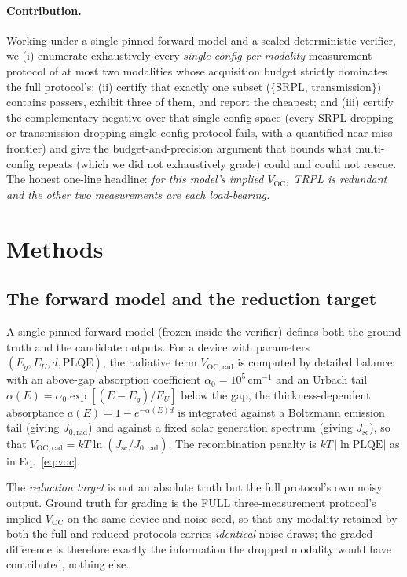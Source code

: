 \documentclass[11pt]{article}
\newcommand{\Voc}{V_{\mathrm{OC}}}
\newcommand{\Vocrad}{V_{\mathrm{OC,rad}}}
\begin{document}
\paragraph{Contribution.} Working under a single pinned forward model and a sealed deterministic verifier, we (i) enumerate exhaustively every \emph{single-config-per-modality} measurement protocol of at most two modalities whose acquisition budget strictly dominates the full protocol's; (ii) certify that exactly one subset ($\{$SRPL, transmission$\}$) contains passers, exhibit three of them, and report the cheapest; and (iii) certify the complementary negative over that single-config space (every SRPL-dropping or transmission-dropping single-config protocol fails, with a quantified near-miss frontier) and give the budget-and-precision argument that bounds what multi-config repeats (which we did not exhaustively grade) could and could not rescue. The honest one-line headline: \emph{for this model's implied $\Voc$, TRPL is redundant and the other two measurements are each load-bearing.}

\section{Methods}

\subsection{The forward model and the reduction target}
\label{sec:forward}

A single pinned forward model (frozen inside the verifier) defines both the ground truth and the candidate outputs. For a device with parameters $(E_g, E_U, d, \mathrm{PLQE})$, the radiative term $\Vocrad$ is computed by detailed balance: with an above-gap absorption coefficient $\alpha_0=10^5\,\mathrm{cm}^{-1}$ and an Urbach tail $\alpha(E)=\alpha_0\exp[(E-E_g)/E_U]$ below the gap, the thickness-dependent absorptance $a(E)=1-e^{-\alpha(E)d}$ is integrated against a Boltzmann emission tail (giving $J_{0,\mathrm{rad}}$) and against a fixed solar generation spectrum (giving $J_{\mathrm{sc}}$), so that $\Vocrad = kT\ln(J_{\mathrm{sc}}/J_{0,\mathrm{rad}})$. The recombination penalty is $kT\,|\ln\mathrm{PLQE}|$ as in Eq.~\eqref{eq:voc}.

The \emph{reduction target} is not an absolute truth but the full protocol's own noisy output. Ground truth for grading is the FULL three-measurement protocol's implied $\Voc$ on the same device and noise seed, so that any modality retained by both the full and reduced protocols carries \emph{identical} noise draws; the graded difference is therefore exactly the information the dropped modality would have contributed, nothing else.
\end{document}
